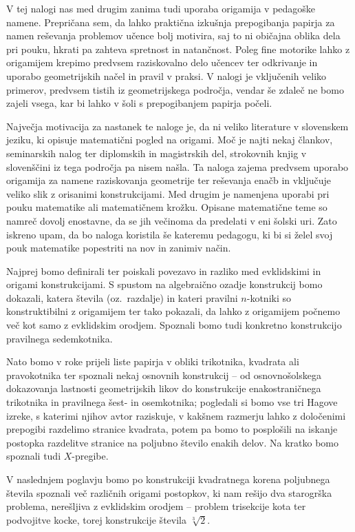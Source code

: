 V tej nalogi nas med drugim zanima tudi uporaba origamija v pedagoške namene. Prepričana sem, da lahko praktična izkušnja prepogibanja papirja za namen reševanja problemov učence bolj motivira, saj to ni običajna oblika dela pri pouku, hkrati pa zahteva spretnost in natančnost. Poleg fine motorike lahko z origamijem krepimo predvsem raziskovalno delo učencev ter odkrivanje in uporabo geometrijskih načel in pravil v praksi. V nalogi je vključenih veliko primerov, predvsem tistih iz geometrijskega področja, vendar še zdaleč ne bomo zajeli vsega, kar bi lahko v šoli s prepogibanjem papirja počeli.

Največja motivacija za nastanek te naloge je, da ni veliko literature v slovenskem jeziku, ki opisuje matematični pogled na origami. Moč je najti nekaj člankov, seminarskih nalog ter diplomskih in magistrskih del, strokovnih knjig v slovenščini iz tega področja pa nisem našla. Ta naloga zajema predvsem uporabo origamija za namene raziskovanja geometrije ter reševanja enačb in vključuje veliko slik z orisanimi konstrukcijami. Med drugim je namenjena uporabi pri pouku matematike ali matematičnem krožku. Opisane matematične teme so namreč dovolj enostavne, da se jih večinoma da predelati v eni šolski uri. Zato iskreno upam, da bo naloga koristila še kateremu pedagogu, ki bi si želel svoj pouk matematike popestriti na nov in zanimiv način.

Najprej bomo definirali ter poiskali povezavo in razliko med evklidskimi in origami konstrukcijami. S spustom na algebraično ozadje konstrukcij bomo dokazali, katera števila (oz.\ razdalje) in kateri pravilni $n$-kotniki so konstruktibilni z origamijem ter tako pokazali, da lahko z origamijem počnemo več kot samo z evklidskim orodjem. Spoznali bomo tudi konkretno konstrukcijo pravilnega sedemkotnika.

Nato bomo v roke prijeli liste papirja v obliki trikotnika, kvadrata ali pravokotnika ter spoznali nekaj osnovnih konstrukcij -- od osnovnošolskega dokazovanja lastnosti geometrijskih likov do konstrukcije enakostraničnega trikotnika in pravilnega šest- in osemkotnika; pogledali si bomo vse tri Hagove izreke, s katerimi njihov avtor raziskuje, v kakšnem razmerju lahko z določenimi prepogibi razdelimo stranice kvadrata, potem pa bomo to posplošili na iskanje postopka razdelitve stranice na poljubno število enakih delov. Na kratko bomo spoznali tudi $X$-pregibe.

V naslednjem poglavju bomo po konstrukciji kvadratnega korena poljubnega števila spoznali več različnih origami postopkov, ki nam rešijo dva starogrška problema, nerešljiva z evklidskim orodjem -- problem trisekcije kota ter podvojitve kocke, torej konstrukcije števila $\sqrt[3]{2}$.

